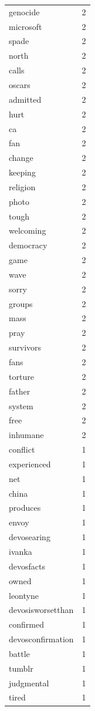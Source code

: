 \begin{tabular}{lr}
genocide & 2 \\
microsoft & 2 \\
spade & 2 \\
north & 2 \\
calls & 2 \\
oscars & 2 \\
admitted & 2 \\
hurt & 2 \\
ca & 2 \\
fan & 2 \\
change & 2 \\
keeping & 2 \\
religion & 2 \\
photo & 2 \\
tough & 2 \\
welcoming & 2 \\
democracy & 2 \\
game & 2 \\
wave & 2 \\
sorry & 2 \\
groups & 2 \\
mass & 2 \\
pray & 2 \\
survivors & 2 \\
fans & 2 \\
torture & 2 \\
father & 2 \\
system & 2 \\
free & 2 \\
inhumane & 2 \\
conflict & 1 \\
experienced & 1 \\
net & 1 \\
china & 1 \\
produces & 1 \\
envoy & 1 \\
devosearing & 1 \\
ivanka & 1 \\
devosfacts & 1 \\
owned & 1 \\
leontyne & 1 \\
devosisworsetthan & 1 \\
confirmed & 1 \\
devosconfirmation & 1 \\
battle & 1 \\
tumblr & 1 \\
judgmental & 1 \\
tired & 1 \\

\end{tabular}
